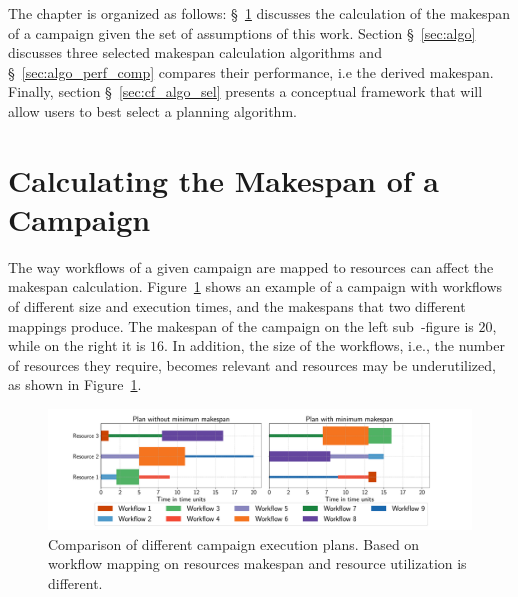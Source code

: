The chapter is organized as follows: \S~\ref{sec:makespan_calc} discusses the calculation of the makespan of a campaign given the set of assumptions of this work.
Section \S~\ref{sec:algo} discusses three selected makespan calculation algorithms and \S~\ref{sec:algo_perf_comp} compares their performance, i.e the derived makespan.
Finally, section \S~\ref{sec:cf_algo_sel} presents a conceptual framework that will allow users to best select a planning algorithm.

\section{Calculating the Makespan of a Campaign}
\label{sec:makespan_calc}
The way workflows of a given campaign are mapped to resources can affect the makespan calculation. 
Figure~\ref{fig:example_makespan} shows an example of a campaign with workflows of different size and execution times, and the makespans that two different mappings produce.
The makespan of the campaign on the left sub~-figure is $20$, while on the right it is $16$.
In addition, the size of the workflows, i.e., the number of resources they require, becomes relevant and resources may be underutilized, as shown in Figure~\ref{fig:example_makespan}.

\begin{figure}[ht!]
    \centering
    \includegraphics[width=.99\textwidth]{figures/campaign/plan_comp.pdf}
    \caption{Comparison of different campaign execution plans. Based on workflow mapping on resources makespan and resource utilization is different.}\label{fig:example_makespan}
\end{figure}


